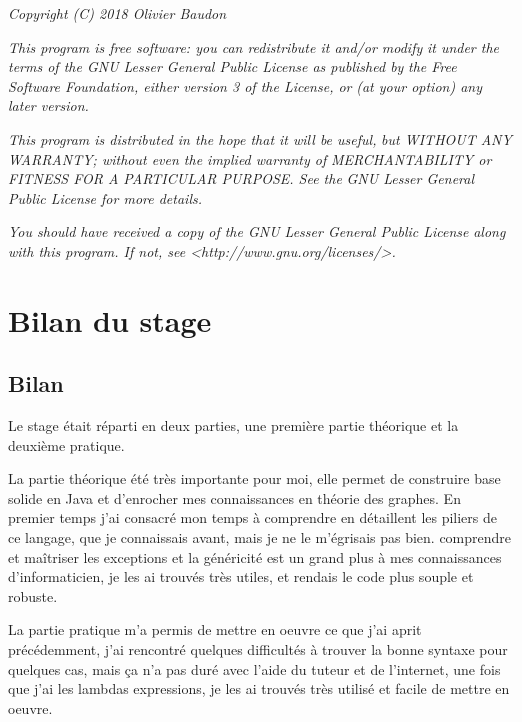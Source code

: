 \documentclass[12pt]{report}
\begin{document}
\begin{center}
\textit{Copyright (C) 2018 Olivier Baudon}

\textit{This program is free software: you can redistribute it and/or modify}
\textit{it under the terms of the GNU Lesser General Public License as published by}
\textit{the Free Software Foundation, either version 3 of the License, or}
\textit{(at your option) any later version.}

\textit{This program is distributed in the hope that it will be useful,}
\textit{but WITHOUT ANY WARRANTY; without even the implied warranty of}
\textit{MERCHANTABILITY or FITNESS FOR A PARTICULAR PURPOSE.  See the}
\textit{GNU Lesser General Public License for more details.}

\textit{You should have received a copy of the GNU Lesser General Public License}
\textit{along with this program.  If not, see <http://www.gnu.org/licenses/>.}
\end{center}

\chapter{Bilan du stage} 

\section{Bilan}

Le stage était réparti en deux parties, une première partie théorique et la deuxième pratique.\newline

La partie théorique été très importante pour moi, elle permet de construire base solide en Java et d'enrocher mes connaissances en théorie des graphes. En premier temps j'ai consacré mon temps à comprendre en détaillent les piliers de ce langage, que je connaissais avant, mais je ne le m'égrisais pas bien. comprendre et maîtriser les exceptions et la généricité est un grand plus à mes connaissances d'informaticien, je les ai trouvés très utiles, et rendais le code plus souple et robuste.\newline

La partie pratique m'a permis de mettre en oeuvre ce que j'ai aprit précédemment, j'ai rencontré quelques difficultés à trouver la bonne syntaxe pour quelques cas, mais ça n'a pas duré avec l'aide du tuteur et de l'internet, une fois que j'ai les lambdas expressions, je les ai trouvés très utilisé et facile de mettre en oeuvre. \newline
\end{document}
